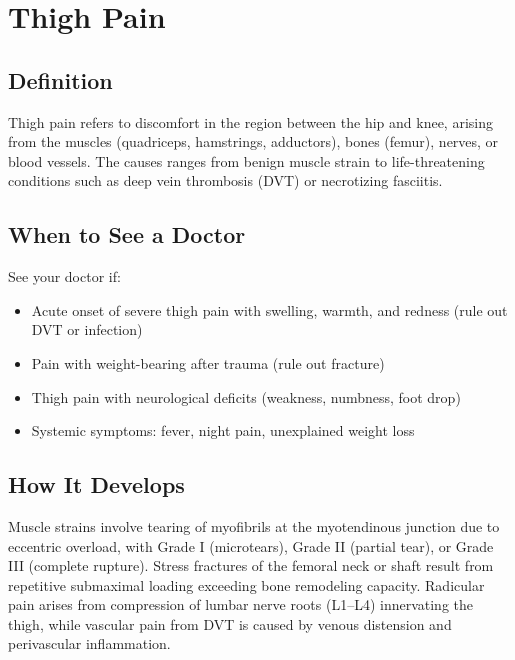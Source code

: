 \chapter{Thigh Pain}

\section*{Definition}
Thigh pain refers to discomfort in the region between the hip and knee, arising from the muscles (quadriceps, hamstrings, adductors), bones (femur), nerves, or blood vessels. The causes ranges from benign muscle strain to life-threatening conditions such as deep vein thrombosis (DVT) or necrotizing fasciitis.

\section*{When to See a Doctor}
See your doctor if:
\begin{itemize}
  \item Acute onset of severe thigh pain with swelling, warmth, and redness (rule out DVT or infection)
  \item Pain with weight-bearing after trauma (rule out fracture)
  \item Thigh pain with neurological deficits (weakness, numbness, foot drop)
  \item Systemic symptoms: fever, night pain, unexplained weight loss
\end{itemize}

\section*{How It Develops}
Muscle strains involve tearing of myofibrils at the myotendinous junction due to eccentric overload, with Grade I (microtears), Grade II (partial tear), or Grade III (complete rupture). Stress fractures of the femoral neck or shaft result from repetitive submaximal loading exceeding bone remodeling capacity. Radicular pain arises from compression of lumbar nerve roots (L1--L4) innervating the thigh, while vascular pain from DVT is caused by venous distension and perivascular inflammation.

